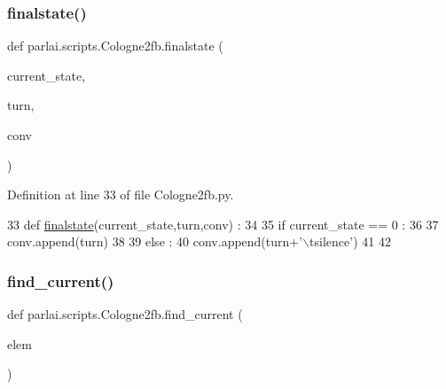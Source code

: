 \mbox{\label{namespaceparlai_1_1scripts_1_1Cologne2fb_afdd76596097051e6d1580703a4f2abe8}} 
\subsubsection{\texorpdfstring{finalstate()}{finalstate()}}
{\footnotesize\ttfamily def parlai.\+scripts.\+Cologne2fb.\+finalstate (\begin{DoxyParamCaption}\item[{}]{current\+\_\+state,  }\item[{}]{turn,  }\item[{}]{conv }\end{DoxyParamCaption})}



Definition at line 33 of file Cologne2fb.\+py.


\begin{DoxyCode}
33 \textcolor{keyword}{def }\hyperlink{namespaceparlai_1_1scripts_1_1Cologne2fb_afdd76596097051e6d1580703a4f2abe8}{finalstate}(current\_state,turn,conv) :
34 
35     \textcolor{keywordflow}{if} current\_state == 0 :
36 
37         conv.append(turn)
38 
39     \textcolor{keywordflow}{else} : 
40         conv.append(turn+\textcolor{stringliteral}{'\(\backslash\)tsilence'})
41 
42 
\end{DoxyCode}
\mbox{\label{namespaceparlai_1_1scripts_1_1Cologne2fb_a0769ed4e08e090e651516d1c4dd50b39}} 
\subsubsection{\texorpdfstring{find\+\_\+current()}{find\_current()}}
{\footnotesize\ttfamily def parlai.\+scripts.\+Cologne2fb.\+find\+\_\+current (\begin{DoxyParamCaption}\item[{}]{elem }\end{DoxyParamCaption})}



